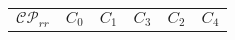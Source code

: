 \begin{tabular}{c|c|c|c|c|}
	\cline{2-5}
	$\mathcal{C}\mathcal{P}_{rr}$ &  $C_{0} \quad C_{1}$ & $C_{3}$ & $C_{2}$ & $C_{4}$ \\
	\cline{2-5}
\end{tabular}
